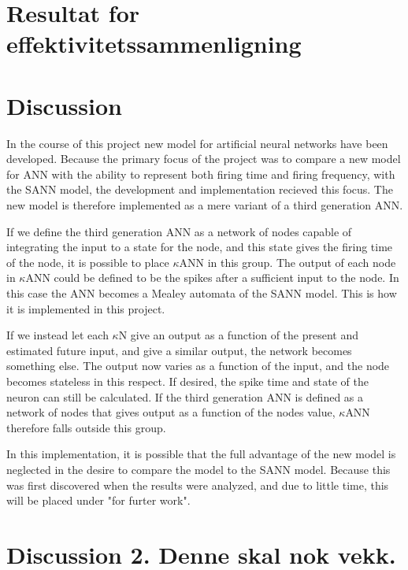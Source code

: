 \section{Resultat for effektivitetssammenligning}



\section{Discussion}
In the course of this project new model for artificial neural networks have been developed. 
Because the primary focus of the project was to compare a new model for ANN with the ability to represent both firing time and firing frequency, with the SANN model, the development and implementation recieved this focus. 
The new model is therefore implemented as a mere variant of a third generation ANN.

If we define the third generation ANN as a network of nodes capable of integrating the input to a state for the node, and this state gives the firing time of the node, it is possible to place $\kappa$ANN in this group.
The output of each node in $\kappa$ANN could be defined to be the spikes after a sufficient input to the node.
In this case the ANN becomes a Mealey automata of the SANN model. This is how it is implemented in this project.

If we instead let each $\kappa$N give an output as a function of the present and estimated future input, and give a similar output, the network becomes something else.
The output now varies as a function of the input, and the node becomes stateless in this respect. If desired, the spike time and state of the neuron can still be calculated. 
If the third generation ANN is defined as a network of nodes that gives output as a function of the nodes value, $\kappa$ANN therefore falls outside this group.

In this implementation, it is possible that the full advantage of the new model is neglected in the desire to compare the model to the SANN model.
Because this was first discovered when the results were analyzed, and due to little time, this will be placed under "for furter work". %



\section{Discussion 2. Denne skal nok vekk.}

